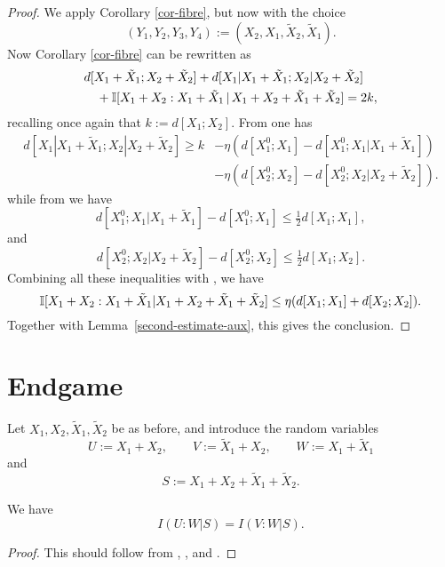 \begin{proof}
  \leanok
  We apply Corollary \ref{cor-fibre}, but now with the choice
  \[
    (Y_1,Y_2,Y_3,Y_4) := (X_2, X_1, \tilde X_2, \tilde X_1).
  \]
  Now Corollary \ref{cor-fibre} can be rewritten as
  \begin{align*}
    &d[X_1+\tilde X_1;X_2+\tilde X_2] + d[X_1|X_1+\tilde X_1; X_2|X_2+\tilde X_2] \\
    &\quad + \mathbb{I}[X_1+X_2 : X_1 + \tilde X_1 \,|\, X_1+X_2+\tilde X_1+\tilde X_2] = 2k,
  \end{align*}
  recalling once again that $k := d[X_1;X_2]$.  From  one has
  \begin{align*}
    d[X_1|X_1+\tilde X_1; X_2|X_2+\tilde X_2]   \geq k &- \eta (d[X^0_1;X_1] - d[X^0_1;X_1|X_1+\tilde X_1]) \\& - \eta (d[X^0_2;X_2] - d[X^0_2;X_2|X_2+\tilde X_2]) .
  \end{align*}
  while from  we have
  \[
    d[X^0_1;X_1|X_1+\tilde X_1] -  d[X^0_1;X_1] \leq  \tfrac{1}{2} d[X_1;X_1],
  \]
  and
  \[
    d[X^0_2;X_2|X_2+\tilde X_2] -  d[X^0_2;X_2] \leq \tfrac{1}{2} d[X_1;X_2].
    \]
  Combining all these inequalities with , we have
  \begin{equation}\label{combined}
  \mathbb{I}[X_1+X_2 : X_1 + \tilde X_1 | X_1+X_2+\tilde X_1+\tilde X_2] \leq \eta ( d[X_1; X_1] + d[X_2; X_2] ).
  \end{equation}
  Together with Lemma~\ref{second-estimate-aux}, this gives the conclusion.
\end{proof}


\section{Endgame}

Let $X_1,X_2,\tilde X_1,\tilde X_2$ be as before, and introduce the random variables
\[U := X_1 + X_2, \qquad V := \tilde X_1 + X_2, \qquad W := X_1 + \tilde X_1\] and
\[  S := X_1 + X_2 + \tilde X_1 + \tilde X_2.\]

\begin{lemma}\label{symm-lemma}
  \leanok
We have
$$ I(U:W | S) = I(V:W | S).$$
\end{lemma}

\begin{proof}\leanok
This should follow from , , and .
\end{proof}

